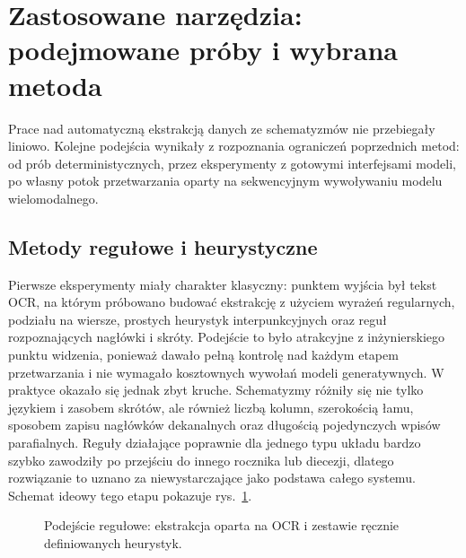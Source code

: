 \section{Zastosowane narzędzia: podejmowane próby i wybrana metoda}\label{sec:narzedzia_metoda}

Prace nad automatyczną ekstrakcją danych ze schematyzmów nie przebiegały liniowo.
Kolejne podejścia wynikały z rozpoznania ograniczeń poprzednich metod: od prób deterministycznych, przez eksperymenty z gotowymi interfejsami modeli, po własny potok przetwarzania oparty na sekwencyjnym wywoływaniu modelu wielomodalnego.

\subsection{Metody regułowe i heurystyczne}\label{subsec:metody_regulowe}

Pierwsze eksperymenty miały charakter klasyczny: punktem wyjścia był tekst OCR, na którym próbowano budować ekstrakcję z użyciem wyrażeń regularnych, podziału na wiersze, prostych heurystyk interpunkcyjnych oraz reguł rozpoznających nagłówki i skróty.
Podejście to było atrakcyjne z inżynierskiego punktu widzenia, ponieważ dawało pełną kontrolę nad każdym etapem przetwarzania i nie wymagało kosztownych wywołań modeli generatywnych.
W praktyce okazało się jednak zbyt kruche.
Schematyzmy różniły się nie tylko językiem i zasobem skrótów, ale również liczbą kolumn, szerokością łamu, sposobem zapisu nagłówków dekanalnych oraz długością pojedynczych wpisów parafialnych.
Reguły działające poprawnie dla jednego typu układu bardzo szybko zawodziły po przejściu do innego rocznika lub diecezji, dlatego rozwiązanie to uznano za niewystarczające jako podstawa całego systemu.
Schemat ideowy tego etapu pokazuje rys.~\ref{fig:regex-approach}.

\begin{figure}[htbp]
\centering
{}
\caption{Podejście regułowe: ekstrakcja oparta na OCR i zestawie ręcznie definiowanych heurystyk.}
\label{fig:regex-approach}
\end{figure}

